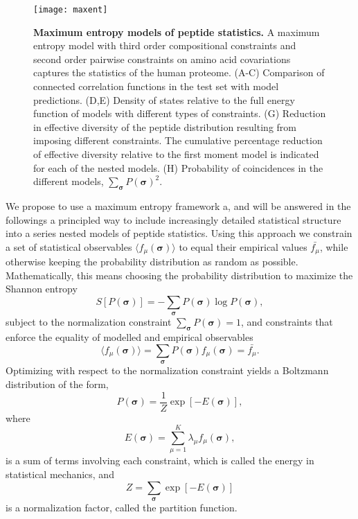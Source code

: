 \documentclass[superscriptaddress,twocolumn,pre]{revtex4}
\newcommand{\B}{\boldsymbol}
\newcommand{\<}{\langle}
\renewcommand{\>}{\rangle}
\begin{document}
\begin{figure*}
    \texttt{[image: maxent]}
        \caption{{\bf Maximum entropy models of peptide statistics.} A maximum entropy model with third order compositional constraints and second order pairwise constraints on amino acid covariations captures the statistics of the human proteome. (A-C) Comparison of connected correlation functions in the test set with model predictions. (D,E) Density of states relative to the full energy function of models with different types of constraints. (G) Reduction in effective diversity of the peptide distribution resulting from imposing different constraints. The cumulative percentage reduction of effective diversity relative to the first moment model is indicated for each of the nested models. (H) Probability of coincidences in the different models, $\sum_{\B \sigma} P(\B \sigma)^2$.
    \label{figmaxent}
    }
\end{figure*}

We propose to use a maximum entropy framework a, and will be answered in the followings a principled way to include increasingly detailed statistical structure into a series nested models of peptide statistics. Using this approach we constrain a set of statistical observables $\langle f_\mu(\boldsymbol \sigma)\rangle$ to equal their empirical values $\bar{f_\mu}$, while otherwise keeping the probability distribution as random as possible. Mathematically, this means choosing the probability distribution to maximize the Shannon entropy
\begin{equation}
    S[P(\B \sigma)] = - \sum_{\B \sigma} P(\B \sigma) \log P(\B \sigma),
\end{equation}
subject to the normalization constraint $\sum_{\B \sigma} P(\B \sigma) = 1$, and constraints that enforce the equality of modelled and empirical observables
\begin{equation}
    \langle f_\mu(\boldsymbol \sigma)\rangle = \sum_{\boldsymbol \sigma} P(\boldsymbol \sigma) f_\mu(\boldsymbol \sigma) = \bar{f_\mu}.
\end{equation}
Optimizing with respect to the normalization constraint yields a Boltzmann distribution of the form,
\begin{equation}
    P(\boldsymbol \sigma) = \frac{1}{Z} \exp\left[ -E(\B \sigma) \right],
\end{equation}
where
\begin{equation}
 E(\B \sigma) = \sum_{\mu=1}^K \lambda_\mu f_\mu(\boldsymbol \sigma),
\end{equation}
is a sum of terms involving each constraint, which is called the energy in statistical mechanics, and 
\begin{equation}
    Z = \sum_{\B \sigma} \exp \left[ - E(\B \sigma) \right]
\end{equation}
is a normalization factor, called the partition function.
\end{document}
